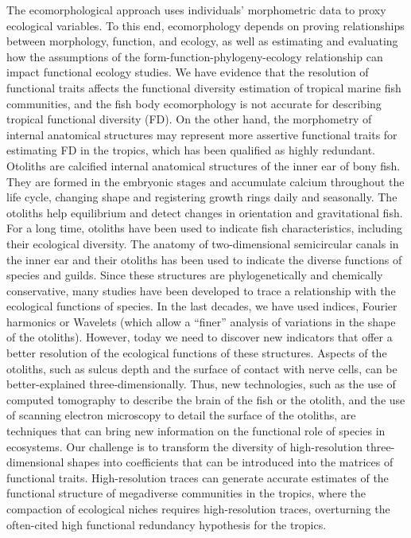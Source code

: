 \documentclass[a4paper]{article}
\begin{document}
The ecomorphological approach uses individuals' morphometric data to proxy ecological variables. To this end, ecomorphology depends on proving relationships between morphology, function, and ecology, as well as estimating and evaluating how the assumptions of the form-function-phylogeny-ecology relationship can impact functional ecology studies. We have evidence that the resolution of functional traits affects the functional diversity estimation of tropical marine fish communities, and the fish body ecomorphology is not accurate for describing tropical functional diversity (FD). On the other hand, the morphometry of internal anatomical structures may represent more assertive functional traits for estimating FD in the tropics, which has been qualified as highly redundant. Otoliths are calcified internal anatomical structures of the inner ear of bony fish. They are formed in the embryonic stages and accumulate calcium throughout the life cycle, changing shape and registering growth rings daily and seasonally. The otoliths help equilibrium and detect changes in orientation and gravitational fish. For a long time, otoliths have been used to indicate fish characteristics, including their ecological diversity. The anatomy of two-dimensional semicircular canals in the inner ear and their otoliths has been used to indicate the diverse functions of species and guilds. Since these structures are phylogenetically and chemically conservative, many studies have been developed to trace a relationship with the ecological functions of species. In the last decades, we have used indices, Fourier harmonics or Wavelets (which allow a “finer” analysis of variations in the shape of the otoliths). However, today we need to discover new indicators that offer a better resolution of the ecological functions of these structures. Aspects of the otoliths, such as sulcus depth and the surface of contact with nerve cells, can be better-explained three-dimensionally. Thus, new technologies, such as the use of computed tomography to describe the brain of the fish or the otolith, and the use of scanning electron microscopy to detail the surface of the otoliths, are techniques that can bring new information on the functional role of species in ecosystems. Our challenge is to transform the diversity of high-resolution three-dimensional shapes into coefficients that can be introduced into the matrices of functional traits. High-resolution traces can generate accurate estimates of the functional structure of megadiverse communities in the tropics, where the compaction of ecological niches requires high-resolution traces, overturning the often-cited high functional redundancy hypothesis for the tropics.
\end{document}
